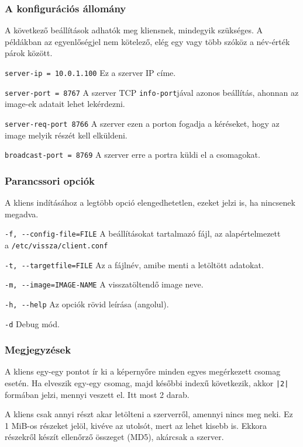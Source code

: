 \documentclass[fleqn,10pt,a4paper,titlepage]{article}
\begin{document}
  \subsubsection{A konfigurációs állomány}
  A következő beállítások adhatók meg kliensnek, mindegyik szükséges. A példákban az egyenlőségjel nem kötelező, elég
  egy vagy több szóköz a név-érték párok között.
  
  \texttt{server-ip = 10.0.1.100} Ez a szerver IP címe.
  
  \texttt{server-port = 8767} A szerver TCP \texttt{info-port}jával azonos beállítás, ahonnan az image-ek adatait lehet
  lekérdezni.
  
  \texttt{server-req-port 8766} A szerver ezen a porton fogadja a kéréseket, hogy az image melyik részét kell elküldeni.

  
  \texttt{broadcast-port = 8769} A szerver erre a portra küldi el a csomagokat.

  \subsubsection{Parancssori opciók}
  A kliens indításához a legtöbb opció elengedhetetlen, ezeket jelzi is, ha nincsenek megadva.
  
  \texttt{-f, -{}-config-file=FILE} A beállításokat tartalmazó fájl, az alapértelmezett\\ a \texttt{/etc/vissza/client.conf}
  
  \texttt{-t, -{}-targetfile=FILE} Az a fájlnév, amibe menti a letöltött adatokat.

  \texttt{-m, -{}-image=IMAGE-NAME} A visszatöltendő image neve.

  \texttt{-h, -{}-help} Az opciók rövid leírása (angolul).
  
  \texttt{-d}  Debug mód.

  \subsubsection{Megjegyzések}
  A kliens egy-egy pontot ír ki a képernyőre minden egyes megérkezett csomag esetén. Ha elveszik egy-egy csomag, majd
  későbbi indexű következik, akkor \texttt{|2|} formában jelzi, mennyi veszett el. Itt most 2 darab.
  
  A kliens csak annyi részt akar letölteni a szerverről, amennyi nincs meg neki. Ez 1 MiB-os részeket jelöl, kivéve az
  utolsót, mert az lehet kisebb is. Ekkora részekről készít ellenőrző összeget (MD5), akárcsak a szerver.
\end{document}
